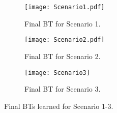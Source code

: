 \begin{figure}[h]
\centering
        \begin{subfigure}[t]{0.4\columnwidth}
\texttt{[image: Scenario1.pdf]}
\caption{Final BT for Scenario 1.}
\label{ER.fig.BTs1}
        \end{subfigure}%
\hfill
        \begin{subfigure}[t]{0.3\columnwidth}
        \centering
\texttt{[image: Scenario2.pdf]}
\caption{Final BT for Scenario 2.}
\label{ER.fig.BTs2}
        \end{subfigure}%
        
        \begin{subfigure}[b]{0.6\columnwidth}
        \centering
\texttt{[image: Scenario3]}
\caption{Final BT for Scenario 3.}
\label{ER.fig.BTs3}
        \end{subfigure}%
        \caption{Final BTs learned for Scenario 1-3.}
\end{figure}

